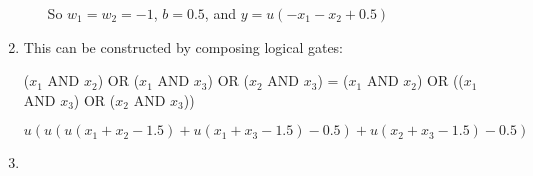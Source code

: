 \documentclass[11pt]{article}
\begin{document}
\begin{enumerate}
\begin{enumerate}
So \(w_1 = w_2 = -1\), \(b = 0.5\), and \(y = u(-x_1 -x_2 + 0.5)\)
\end{enumerate}

\item This can be constructed by composing logical gates: 

(\(x_1\) AND \(x_2\)) OR (\(x_1\) AND \(x_3\)) OR (\(x_2\) AND \(x_3\)) = (\(x_1\) AND \(x_2\)) OR ((\(x_1\) AND \(x_3\)) OR (\(x_2\) AND \(x_3\)))

\(u(u(u(x_1 + x_2 - 1.5) + u(x_1 + x_3 - 1.5) - 0.5) + u(x_2 + x_3 - 1.5) - 0.5)\)

\item 
\end{enumerate}
\end{document}
